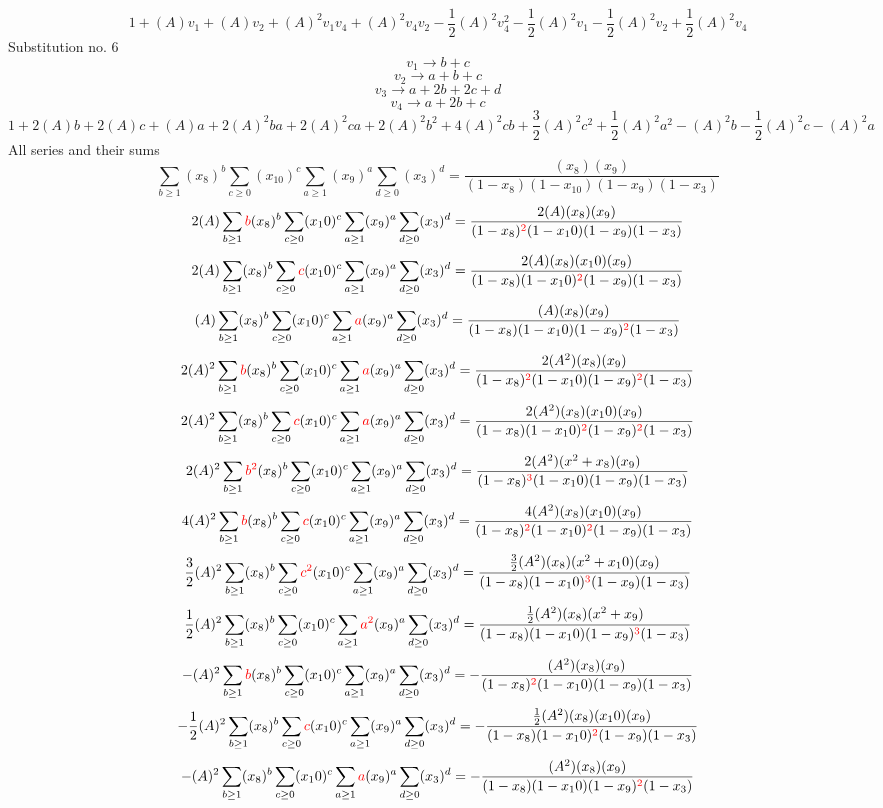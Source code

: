 \documentclass{article}
\begin{document}
\[1+(A)v_1+(A)v_2+(A)^2v_1v_4+(A)^2v_4v_2-\frac{1}{2}(A)^2v_4^{2}-\frac{1}{2}(A)^2v_1-\frac{1}{2}(A)^2v_2+\frac{1}{2}(A)^2v_4\]Substitution no. 6\[v_1\rightarrow{b+c}\]\[v_2\rightarrow{a+b+c}\]\[v_3\rightarrow{a+2b+2c+d}\]\[v_4\rightarrow{a+2b+c}\]\[1+2(A)b+2(A)c+(A)a+2(A)^2ba+2(A)^2ca+2(A)^2b^{2}+4(A)^2cb+\frac{3}{2}(A)^2c^{2}+\frac{1}{2}(A)^2a^{2}-(A)^2b-\frac{1}{2}(A)^2c-(A)^2a\]All series and their sums\[\sum_{b\geq{1}}(x_8)^{b}\sum_{c\geq{0}}(x_10)^{c}\sum_{a\geq{1}}(x_9)^{a}\sum_{d\geq{0}}(x_3)^{d}=\frac{(x_8)(x_9)}{(1-x_8)(1-x_10)(1-x_9)(1-x_3)}\]\[2(A)\sum_{b\geq{1}}\textcolor{red}{b}(x_8)^{b}\sum_{c\geq{0}}(x_10)^{c}\sum_{a\geq{1}}(x_9)^{a}\sum_{d\geq{0}}(x_3)^{d}=\frac{2(A)(x_8)(x_9)}{(1-x_8)^{\textcolor{red}{2}}(1-x_10)(1-x_9)(1-x_3)}\]\[2(A)\sum_{b\geq{1}}(x_8)^{b}\sum_{c\geq{0}}\textcolor{red}{c}(x_10)^{c}\sum_{a\geq{1}}(x_9)^{a}\sum_{d\geq{0}}(x_3)^{d}=\frac{2(A)(x_8)(x_10)(x_9)}{(1-x_8)(1-x_10)^{\textcolor{red}{2}}(1-x_9)(1-x_3)}\]\[(A)\sum_{b\geq{1}}(x_8)^{b}\sum_{c\geq{0}}(x_10)^{c}\sum_{a\geq{1}}\textcolor{red}{a}(x_9)^{a}\sum_{d\geq{0}}(x_3)^{d}=\frac{(A)(x_8)(x_9)}{(1-x_8)(1-x_10)(1-x_9)^{\textcolor{red}{2}}(1-x_3)}\]\[2(A)^{2}\sum_{b\geq{1}}\textcolor{red}{b}(x_8)^{b}\sum_{c\geq{0}}(x_10)^{c}\sum_{a\geq{1}}\textcolor{red}{a}(x_9)^{a}\sum_{d\geq{0}}(x_3)^{d}=\frac{2(A^{2})(x_8)(x_9)}{(1-x_8)^{\textcolor{red}{2}}(1-x_10)(1-x_9)^{\textcolor{red}{2}}(1-x_3)}\]\[2(A)^{2}\sum_{b\geq{1}}(x_8)^{b}\sum_{c\geq{0}}\textcolor{red}{c}(x_10)^{c}\sum_{a\geq{1}}\textcolor{red}{a}(x_9)^{a}\sum_{d\geq{0}}(x_3)^{d}=\frac{2(A^{2})(x_8)(x_10)(x_9)}{(1-x_8)(1-x_10)^{\textcolor{red}{2}}(1-x_9)^{\textcolor{red}{2}}(1-x_3)}\]\[2(A)^{2}\sum_{b\geq{1}}\textcolor{red}{b^{2}}(x_8)^{b}\sum_{c\geq{0}}(x_10)^{c}\sum_{a\geq{1}}(x_9)^{a}\sum_{d\geq{0}}(x_3)^{d}=\frac{2(A^{2})(x^{2}+x_8)(x_9)}{(1-x_8)^{\textcolor{red}{3}}(1-x_10)(1-x_9)(1-x_3)}\]\[4(A)^{2}\sum_{b\geq{1}}\textcolor{red}{b}(x_8)^{b}\sum_{c\geq{0}}\textcolor{red}{c}(x_10)^{c}\sum_{a\geq{1}}(x_9)^{a}\sum_{d\geq{0}}(x_3)^{d}=\frac{4(A^{2})(x_8)(x_10)(x_9)}{(1-x_8)^{\textcolor{red}{2}}(1-x_10)^{\textcolor{red}{2}}(1-x_9)(1-x_3)}\]\[\frac{3}{2}(A)^{2}\sum_{b\geq{1}}(x_8)^{b}\sum_{c\geq{0}}\textcolor{red}{c^{2}}(x_10)^{c}\sum_{a\geq{1}}(x_9)^{a}\sum_{d\geq{0}}(x_3)^{d}=\frac{\frac{3}{2}(A^{2})(x_8)(x^{2}+x_10)(x_9)}{(1-x_8)(1-x_10)^{\textcolor{red}{3}}(1-x_9)(1-x_3)}\]\[\frac{1}{2}(A)^{2}\sum_{b\geq{1}}(x_8)^{b}\sum_{c\geq{0}}(x_10)^{c}\sum_{a\geq{1}}\textcolor{red}{a^{2}}(x_9)^{a}\sum_{d\geq{0}}(x_3)^{d}=\frac{\frac{1}{2}(A^{2})(x_8)(x^{2}+x_9)}{(1-x_8)(1-x_10)(1-x_9)^{\textcolor{red}{3}}(1-x_3)}\]\[-(A)^{2}\sum_{b\geq{1}}\textcolor{red}{b}(x_8)^{b}\sum_{c\geq{0}}(x_10)^{c}\sum_{a\geq{1}}(x_9)^{a}\sum_{d\geq{0}}(x_3)^{d}=-\frac{(A^{2})(x_8)(x_9)}{(1-x_8)^{\textcolor{red}{2}}(1-x_10)(1-x_9)(1-x_3)}\]\[-\frac{1}{2}(A)^{2}\sum_{b\geq{1}}(x_8)^{b}\sum_{c\geq{0}}\textcolor{red}{c}(x_10)^{c}\sum_{a\geq{1}}(x_9)^{a}\sum_{d\geq{0}}(x_3)^{d}=-\frac{\frac{1}{2}(A^{2})(x_8)(x_10)(x_9)}{(1-x_8)(1-x_10)^{\textcolor{red}{2}}(1-x_9)(1-x_3)}\]\[-(A)^{2}\sum_{b\geq{1}}(x_8)^{b}\sum_{c\geq{0}}(x_10)^{c}\sum_{a\geq{1}}\textcolor{red}{a}(x_9)^{a}\sum_{d\geq{0}}(x_3)^{d}=-\frac{(A^{2})(x_8)(x_9)}{(1-x_8)(1-x_10)(1-x_9)^{\textcolor{red}{2}}(1-x_3)}\]
\end{document}
